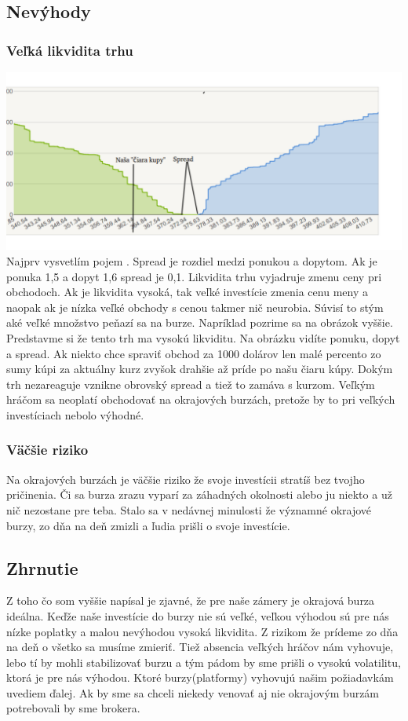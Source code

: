 \subsection{Nevýhody} 
\subsubsection{Veľká likvidita trhu} 
\includegraphics[width=1\textwidth]{stamp} 
Najprv vysvetlím pojem \cite{ZAC}. Spread je rozdiel medzi ponukou a dopytom. Ak je ponuka 1,5 a dopyt 1,6 spread je 0,1. Likvidita trhu vyjadruje zmenu ceny pri obchodoch. Ak je likvidita vysoká, tak veľké investície zmenia cenu meny a naopak ak je nízka veľké obchody s cenou takmer nič neurobia. Súvisí to stým aké veľké množstvo peňazí sa  na burze. Napríklad pozrime sa na obrázok vyššie. Predstavme si že tento trh ma vysokú likviditu. Na obrázku vidíte ponuku, dopyt a spread. Ak niekto chce spraviť obchod za 1000 dolárov len malé percento zo sumy kúpi za aktuálny kurz zvyšok drahšie až príde po našu čiaru kúpy. Dokým trh nezareaguje vznikne obrovský spread a tiež to zamáva s kurzom. Veľkým hráčom sa neoplatí obchodovať na okrajových burzách, pretože by to pri veľkých investíciach nebolo výhodné.
\subsubsection{Väčšie riziko}
Na okrajových burzách je väčšie riziko že svoje investícii stratíš bez tvojho pričinenia. Či sa burza zrazu vyparí za záhadných okolnosti alebo ju niekto  a už nič nezostane pre teba. Stalo sa v nedávnej minulosti že významné okrajové burzy, zo dňa na deň zmizli a ľudia prišli o svoje investície.  
\subsection{Zhrnutie} 
Z toho čo som vyššie napísal je zjavné,  že pre naše zámery je okrajová burza ideálna. Keďže naše investície do burzy nie sú veľké, veľkou výhodou sú pre nás nízke poplatky a malou nevýhodou vysoká likvidita. Z rizikom že prídeme zo dňa na deň o všetko sa musíme zmieriť. Tiež absencia veľkých hráčov nám vyhovuje, lebo tí by mohli stabilizovať burzu a tým pádom by sme prišli o vysokú volatilitu, ktorá je pre nás výhodou. Ktoré burzy(platformy) vyhovujú našim požiadavkám uvediem ďalej. Ak by sme sa chceli niekedy venovať aj nie okrajovým burzám potrebovali by sme brokera. 
